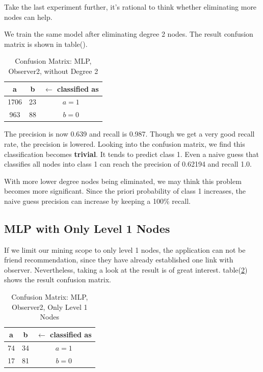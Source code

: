 \documentclass[11pt,a4paper]{article}
\begin{document}
Take the last experiment further, it's rational to 
think whether eliminating more nodes can help. 

We train the same model after eliminating degree 2 nodes. 
The result confusion matrix is shown in table().

\begin{table}[htb]
	\centering
	\caption{Confusion Matrix: MLP, Observer2, without Degree 2}
	\label{tbl:cm_o2_d2}
	\begin{tabular}{cc|c}
	\hline
a & b & \textbf{$\leftarrow$ classified as}\\	
	\hline
 1706 &23 &    $a = 1$\\
  963 &88 &    $b = 0$\\
	\hline
	\end{tabular}
\end{table}

The precision is now 0.639 and recall is 0.987. 
Though we get a very good recall rate, the precision 
is lowered. Looking into the confusion matrix, 
we find this classification becomes \textbf{trivial}. 
It tends to predict class 1. Even a naive guess 
that classifies all nodes into class 1 can reach 
the precision of 0.62194 and recall 1.0. 

With more lower degree nodes being eliminated, 
we may think this problem becomes more significant. 
Since the priori probability of class 1 increases, 
the naive guess precision can increase by keeping 
a 100\% recall. 

\subsection{MLP with Only Level 1 Nodes}

If we limit our mining scope to only level 1 nodes, 
the application can not be friend recommendation, since 
they have already established one link with observer. 
Nevertheless, taking a look at the result is of great interest. 
table(\ref{tbl:cm_o2_l1}) shows the result confusion matrix. 

\begin{table}[htb]
	\centering
	\caption{Confusion Matrix: MLP, Observer2, Only Level 1 Nodes}
	\label{tbl:cm_o2_l1}
	\begin{tabular}{cc|c}
	\hline
a & b & \textbf{$\leftarrow$ classified as}\\	
	\hline
 74 &34 &    $a = 1$\\
  17 &81 &    $b = 0$\\
	\hline
	\end{tabular}
\end{table}
\end{document}
